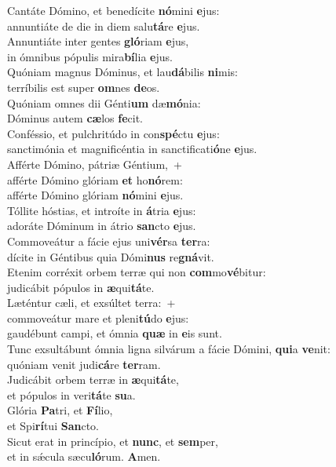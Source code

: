 \evenverse Cantáte Dómino, et benedícite \textbf{nó}mini \textbf{e}jus:~\*\\
\evenverse annuntiáte de die in diem salu\textbf{tá}re \textbf{e}jus.\\
\oddverse Annuntiáte inter gentes \textbf{gló}riam \textbf{e}jus,~\*\\
\oddverse in ómnibus pópulis mira\textbf{bí}lia \textbf{e}jus.\\
\evenverse Quóniam magnus Dóminus, et lau\textbf{dá}bilis \textbf{ni}mis:~\*\\
\evenverse terríbilis est super \textbf{om}nes \textbf{de}os.\\
\oddverse Quóniam omnes dii Génti\textbf{um} dæ\textbf{mó}nia:~\*\\
\oddverse Dóminus autem \textbf{cæ}los \textbf{fe}cit.\\
\evenverse Conféssio, et pulchritúdo in con\textbf{spé}ctu \textbf{e}jus:~\*\\
\evenverse sanctimónia et magnificéntia in sanctificati\textbf{ó}ne \textbf{e}jus.\\
\oddverse Afférte Dómino, pátriæ Géntium,~+\\
\oddverse  afférte Dómino glóriam \textbf{et} ho\textbf{nó}rem:~\*\\
\oddverse afférte Dómino glóriam \textbf{nó}mini \textbf{e}jus.\\
\evenverse Tóllite hóstias, et introíte in \textbf{á}tria \textbf{e}jus:~\*\\
\evenverse adoráte Dóminum in átrio \textbf{san}cto \textbf{e}jus.\\
\oddverse Commoveátur a fácie ejus uni\textbf{vér}sa \textbf{ter}ra:~\*\\
\oddverse dícite in Géntibus quia Dómi\textbf{nus} re\textbf{gná}vit.\\
\evenverse Etenim corréxit orbem terræ qui non \textbf{com}mo\textbf{vé}bitur:~\*\\
\evenverse judicábit pópulos in \textbf{æ}qui\textbf{tá}te.\\
\oddverse Læténtur cæli, et exsúltet terra:~+\\
\oddverse  commoveátur mare et pleni\textbf{tú}do \textbf{e}jus:~\*\\
\oddverse gaudébunt campi, et ómnia \textbf{quæ} in \textbf{e}is sunt.\\
\evenverse Tunc exsultábunt ómnia ligna silvárum a fácie Dómini, \textbf{qui}a \textbf{ve}nit:~\*\\
\evenverse quóniam venit judi\textbf{cá}re \textbf{ter}ram.\\
\oddverse Judicábit orbem terræ in \textbf{æ}qui\textbf{tá}te,~\*\\
\oddverse et pópulos in veri\textbf{tá}te \textbf{su}a.\\
\evenverse Glória \textbf{Pa}tri, et \textbf{Fí}lio,~\*\\
\evenverse et Spi\textbf{rí}tui \textbf{San}cto.\\
\oddverse Sicut erat in princípio, et \textbf{nunc}, et \textbf{sem}per,~\*\\
\oddverse et in sǽcula sæcu\textbf{ló}rum. \textbf{A}men.\\
